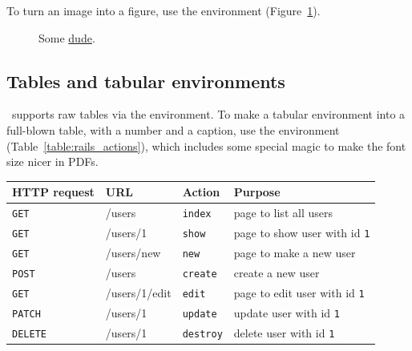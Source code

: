 
To turn an image into a figure, use the  environment (Figure~\ref{fig:the_dude}).

\begin{figure}
\caption{Some \href{http://michaelhartl.com/}{dude}.\label{fig:the_dude}}
\end{figure}

\subsection{Tables and tabular environments}
\label{tables_and_tabular}

\PolyTeXnic\ supports raw tables via the  environment. To make a tabular environment into a full-blown table, with a number and a caption, use the  environment (Table~\ref{table:rails_actions}), which includes some special magic to make the font size nicer in PDFs.

\bigskip

\begin{tabular}{llll}
\textbf{HTTP request} & \textbf{URL} & \textbf{Action} & \textbf{Purpose} \\ \hline

\texttt{GET} & /users & \texttt{index} & page to list all users \\
\texttt{GET} & /users/1 & \texttt{show} & page to show user with id \texttt{1}\\
\texttt{GET} & /users/new & \texttt{new} & page to make a new user \\
\texttt{POST} & /users & \texttt{create} & create a new user \\
\texttt{GET} & /users/1/edit & \texttt{edit} & page to edit user with id \texttt{1} \\
\texttt{PATCH} & /users/1 & \texttt{update} & update user with id \texttt{1}  \\
\texttt{DELETE} & /users/1 & \texttt{destroy} & delete user with id \texttt{1}
\end{tabular}

